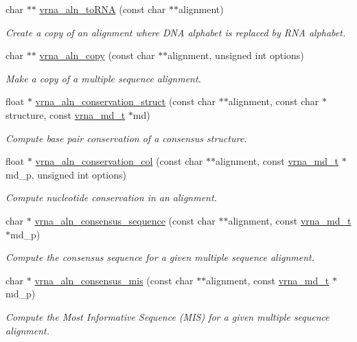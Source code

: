 \begin{DoxyCompactItemize}
char $\ast$$\ast$ \hyperlink{group__aln__utils_ga7886fc678553c06472a712a335cde9cf}{vrna\+\_\+aln\+\_\+to\+R\+NA} (const char $\ast$$\ast$alignment)
\begin{DoxyCompactList}\small\item\em Create a copy of an alignment where D\+NA alphabet is replaced by R\+NA alphabet. \end{DoxyCompactList}\item 
char $\ast$$\ast$ \hyperlink{group__aln__utils_ga08cdca592461436860daf9738279ce17}{vrna\+\_\+aln\+\_\+copy} (const char $\ast$$\ast$alignment, unsigned int options)
\begin{DoxyCompactList}\small\item\em Make a copy of a multiple sequence alignment. \end{DoxyCompactList}\item 
float $\ast$ \hyperlink{group__aln__utils_gab6f16a2ea93f3bfd4d089cc8d448bb16}{vrna\+\_\+aln\+\_\+conservation\+\_\+struct} (const char $\ast$$\ast$alignment, const char $\ast$structure, const \hyperlink{group__model__details_ga1f8a10e12a0a1915f2a4eff0b28ea17c}{vrna\+\_\+md\+\_\+t} $\ast$md)
\begin{DoxyCompactList}\small\item\em Compute base pair conservation of a consensus structure. \end{DoxyCompactList}\item 
float $\ast$ \hyperlink{group__aln__utils_gaa12b481a7e7b965ef2eb1bcc4399e759}{vrna\+\_\+aln\+\_\+conservation\+\_\+col} (const char $\ast$$\ast$alignment, const \hyperlink{group__model__details_ga1f8a10e12a0a1915f2a4eff0b28ea17c}{vrna\+\_\+md\+\_\+t} $\ast$md\+\_\+p, unsigned int options)
\begin{DoxyCompactList}\small\item\em Compute nucleotide conservation in an alignment. \end{DoxyCompactList}\item 
char $\ast$ \hyperlink{group__aln__utils_ga1f74eba3006fddd91195456ed1e58483}{vrna\+\_\+aln\+\_\+consensus\+\_\+sequence} (const char $\ast$$\ast$alignment, const \hyperlink{group__model__details_ga1f8a10e12a0a1915f2a4eff0b28ea17c}{vrna\+\_\+md\+\_\+t} $\ast$md\+\_\+p)
\begin{DoxyCompactList}\small\item\em Compute the consensus sequence for a given multiple sequence alignment. \end{DoxyCompactList}\item 
char $\ast$ \hyperlink{group__aln__utils_gad9e74f6549e819f5f330a06d57d45f2a}{vrna\+\_\+aln\+\_\+consensus\+\_\+mis} (const char $\ast$$\ast$alignment, const \hyperlink{group__model__details_ga1f8a10e12a0a1915f2a4eff0b28ea17c}{vrna\+\_\+md\+\_\+t} $\ast$md\+\_\+p)
\begin{DoxyCompactList}\small\item\em Compute the Most Informative Sequence (M\+IS) for a given multiple sequence alignment. \end{DoxyCompactList}\end{DoxyCompactItemize}


